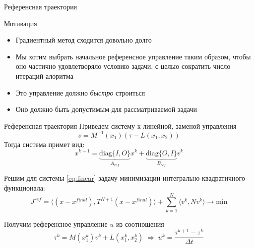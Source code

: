 \documentclass[16pt]{beamer}
\begin{document}
    \begin{frame}{Референсная траектория}
        \begin{block}{Мотивация}
            \begin{itemize}
                \item Градиентный метод сходится довольно долго
                \item Мы хотим выбрать начальное референсное управление таким образом, чтобы оно частично удовлетворяло условию задачи, с целью сократить число итераций алоритма
                \item Это управление должно \textit{быстро} строиться
                \item Оно должно быть допустимым для рассматриваемой задачи
            \end{itemize}
        \end{block}
    \end{frame}

    \begin{frame}{Референсная траектория}
        Приведем систему к линейной, заменой управления
        $$
            v = M^{-1}(x_1)(\tau - L(x_1, x_2))
        $$
        Тогда система примет вид:
        \begin{equation}\label{eq:linear}
            x^{k+1} =  \underbrace{\mathrm{diag}\{I,O\}}_{A_{ref}} x^{k} + \underbrace{\mathrm{diag}\{O, I\}}_{B_{ref}} v^{k}
        \end{equation}

        Решим для системы \eqref{eq:linear} задачу минимизации интегрально-квадратичного функционала:
        $$
            J^{ref} = \langle (x-x^{final}), T^{N+1}(x-x^{final}) \rangle + \sum_{k=1}^{N} \langle v^k, Nv^k \rangle \longrightarrow \mathrm{min}
        $$

        Получим референсное управление $u$ из соотношения
        $$
            \tau^k = M(x_1^k)v^k + L(x_1^k,x_2^k) \;\Longrightarrow\; u^{k} = \frac{\tau^{k+1} - \tau^{k}}{\Delta t}
        $$
    \end{frame}
\end{document}
